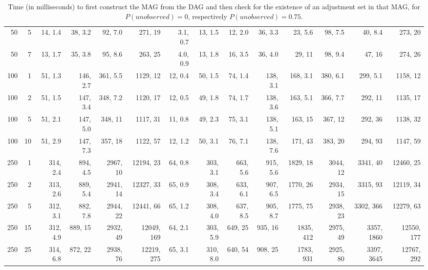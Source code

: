 \begin{table}
\begin{center}
\begin{tabular}{|rr | r|r|r|r | rr|rr|rr|rr| }
50&5&
14, 1.4&38, 3.2&92, 7.0&271, 19&3.1, 0.7&13, 1.5&12, 2.0&36, 3.3&23, 5.6&98, 7.5&40, 8.4&273, 20\\
50&7&
13, 1.7&35, 3.8&95, 8.6&263, 25&4.0, 0.9&13, 1.8&16, 3.5&36, 4.0&29, 11&98, 9.4&47, 16&274, 26\\
\hline
100&1&
51, 1.3&146, 2.7&361, 5.5&1129, 12&12, 0.4&50, 1.5&74, 1.4&138, 3.1&168, 3.1&380, 6.1&299, 5.1&1158, 12\\
100&2&
51, 1.5&147, 3.4&348, 7.2&1120, 17&12, 0.5&49, 1.8&74, 1.7&138, 3.6&163, 5.1&366, 7.7&292, 11&1135, 17\\
100&5&
51, 2.1&147, 5.0&348, 11&1117, 31&11, 0.8&49, 2.3&75, 3.1&138, 5.1&163, 15&367, 12&292, 36&1138, 32\\
100&10&
51, 2.9&147, 7.3&357, 18&1122, 57&12, 1.2&50, 3.1&76, 7.1&138, 7.6&171, 43&383, 20&294, 93&1147, 59\\
\hline
250&1&
314, 2.4&894, 4.5&2967, 10&12194, 23&64, 0.8&303, 3.1&663, 5.6&915, 5.6&1829, 18&3044, 12&3341, 40&12460, 25\\
250&2&
313, 2.6&889, 5.4&2941, 14&12327, 33&65, 0.9&308, 3.4&633, 6.1&907, 6.5&1770, 26&2934, 15&3315, 93&12119, 34\\
250&5&
312, 3.1&882, 7.8&2944, 22&12441, 66&65, 1.2&308, 4.0&637, 8.5&905, 8.7&1775, 75&2938, 23&3302, 366&12279, 63\\
250&15&
312, 4.9&889, 15&2932, 49&12049, 169&64, 2.1&303, 5.9&649, 25&935, 16&1835, 412&2975, 49&3357, 1860&12550, 177\\
250&25&
314, 6.8&872, 22&2938, 76&12219, 275&65, 3.1&310, 8.0&640, 54&908, 25&1783, 931&2925, 80&3397, 3645&12767, 292\\
\hline\end{tabular}
  \end{center}\vspace*{-3mm}
  \caption{Time (in milliseconds) to first construct the MAG from the DAG and then check for the existence of an adjustment set in that MAG, for $P(\textit{unobserved}) = 0$, respectively $P(\textit{unobserved}) = 0.75$.
  }\label{table:mags:runtimes}
  \end{table}
